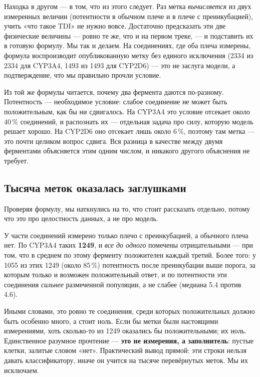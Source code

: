 \documentclass[11pt,a4paper]{article}
\begin{document}
Находка в другом --- в том, что из этого следует. Раз метка \emph{вычисляется} из двух измеренных
величин (потентности в обычном плече и в плече с преинкубацией), учить «что такое TDI» не нужно
вовсе. Достаточно предсказать эти две физические величины --- ровно те же, что и на первом
треке, --- и подставить их в готовую формулу. Мы так и делаем. На соединениях, где оба плеча
измерены, формула воспроизводит опубликованную метку без единого исключения (2334 из 2334 для
CYP3A4, 1493 из 1493 для CYP2D6) --- это не заслуга модели, а подтверждение, что мы правильно
прочли условие.

Из той же формулы читается, почему два фермента даются по-разному. Потентность --- необходимое
условие: слабое соединение не может быть положительным, как бы ни сдвигалось. На CYP3A4 это
условие отсекает около 40\,\% соединений, и распознать их --- отдельная задача про силу, которую
модель решает хорошо. На CYP2D6 оно отсекает лишь около 6\,\%, поэтому там метка --- это почти
целиком вопрос сдвига. Вся разница в качестве между двумя ферментами объясняется этим одним
числом, и никакого другого объяснения не требует.

\subsection*{Тысяча меток оказалась заглушками}

Проверяя формулу, мы наткнулись на то, что стоит рассказать отдельно, потому что это про
целостность данных, а не про модель.

У части соединений измерено только плечо с преинкубацией, а обычного плеча нет. По CYP3A4 таких
\textbf{1249}, и \emph{все до одного} помечены отрицательными --- при том, что в среднем по этому
ферменту положителен каждый третий. Более того: у 1055 из этих 1249 (около 85\,\%) потентность
после преинкубации выше порога, за которым только и возможен положительный ответ, и по потентности
эти соединения \emph{сильнее} размеченной популяции, а не слабее (медиана 5.4 против 4.6).

Иными словами, это ровно те соединения, среди которых положительных должно быть особенно много,
а стоит ноль. Если бы метки были настоящими измерениями, хоть сколько-то из 1249 оказались бы
положительными; их ноль. Единственное разумное прочтение --- \textbf{это не измерения, а
заполнитель}: пустые клетки, залитые словом «нет». Практический вывод прямой: эти строки нельзя
давать классификатору, иначе он учится на тысяче перевёрнутых меток. Мы их исключаем.
\end{document}
